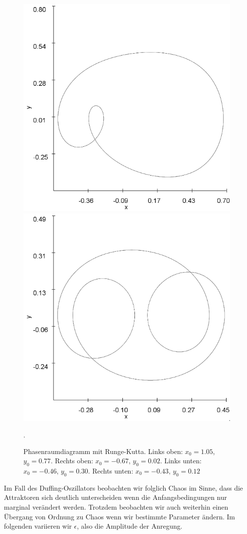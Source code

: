 \documentclass{scrartcl}
\begin{document}
\begin{figure}[!htbp]
\includegraphics[scale=0.4]{duffing-awp4-500k-nach-500k-h0,01-runge}
\includegraphics[scale=0.4]{duffing-awp5-500k-nach-500k-h0,01-runge}
\caption{Phasenraumdiagramm mit Runge-Kutta. Links oben: $x_0=1.05$, $y_0=0.77$. Rechts oben: $x_0=-0.67$, $y_0=0.02$. Links unten: $x_0=-0.46$, $y_0=0.30$. Rechts unten: $x_0=-0.43$, $y_0=0.12$}. 
\label{fig:duffing-allawp}
\end{figure}
Im Fall des Duffing-Oszillators beobachten wir folglich Chaos im Sinne, dass die Attraktoren sich deutlich unterscheiden wenn die Anfangsbedingungen nur marginal verändert werden. Trotzdem beobachten wir auch weiterhin einen Übergang von Ordnung zu Chaos wenn wir bestimmte Parameter ändern. Im folgenden variieren wir $\epsilon$, also die Amplitude der Anregung.
\end{document}
